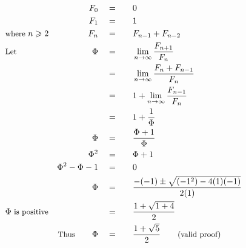 \begin{alignat*}{5}
&\,&F_0\quad&=\quad&&0\\
&\,&F_1\quad&=&&1\\
&\small\text{where }n\geqslant2&F_n\quad&=&&F_{n-1}+F_{n-2}\\
&\small\text{Let }&\Phi\quad&=&&\lim_{n\to\infty}\frac{F_{n+1}}{F_n}\\
&\,&\,&=&&\lim_{n\to\infty}\frac{F_n+F_{n-1}}{F_n}\\
&\,&\,&=&&1+\lim_{n\to\infty}\frac{F_{n-1}}{F_n}\\
&\,&\,&=&&1+\frac{1}{\Phi}\\
&\,&\Phi\quad&=&&\frac{\Phi+1}{\Phi}\\
&\,&\Phi^2\quad&=&&\Phi+1\\
&\,&\Phi^2-\Phi-1\quad&=&&0\\
&\,&\Phi\quad&=&&\frac{-(-1)\pm\sqrt{(-1^2)-4(1)(-1)}}{2(1)}\\
&\small\Phi\text{ is positive}&\,&=&&\frac{1+\sqrt{1+4}}{2}\\
&\,&\small\text{Thus}\normalsize\qquad\Phi\quad&=&&\frac{1+\sqrt{5}}{2}\qquad\small\text{(valid proof)}
\end{alignat*}
